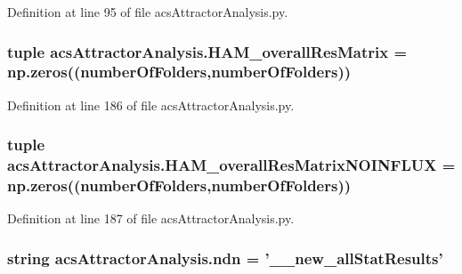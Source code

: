 Definition at line 95 of file acs\-Attractor\-Analysis.\-py.

\hypertarget{a00091_a46dc8cdfb545b64952370e51ff02336f}{
\subsubsection[{H\-A\-M\-\_\-overall\-Res\-Matrix}]{\setlength{\rightskip}{0pt plus 5cm}tuple acs\-Attractor\-Analysis.\-H\-A\-M\-\_\-overall\-Res\-Matrix = np.\-zeros(({\bf number\-Of\-Folders},{\bf number\-Of\-Folders}))}}\label{a00091_a46dc8cdfb545b64952370e51ff02336f}


Definition at line 186 of file acs\-Attractor\-Analysis.\-py.

\hypertarget{a00091_a9aa1adb46370d97e4f38e7f09eb7a97c}{
\subsubsection[{H\-A\-M\-\_\-overall\-Res\-Matrix\-N\-O\-I\-N\-F\-L\-U\-X}]{\setlength{\rightskip}{0pt plus 5cm}tuple acs\-Attractor\-Analysis.\-H\-A\-M\-\_\-overall\-Res\-Matrix\-N\-O\-I\-N\-F\-L\-U\-X = np.\-zeros(({\bf number\-Of\-Folders},{\bf number\-Of\-Folders}))}}\label{a00091_a9aa1adb46370d97e4f38e7f09eb7a97c}


Definition at line 187 of file acs\-Attractor\-Analysis.\-py.

\hypertarget{a00091_a109ce3a379d650b3f9b08debc0433a19}{
\subsubsection[{ndn}]{\setlength{\rightskip}{0pt plus 5cm}string acs\-Attractor\-Analysis.\-ndn = '\-\_\-\_\-new\-\_\-all\-Stat\-Results'}}\label{a00091_a109ce3a379d650b3f9b08debc0433a19}


